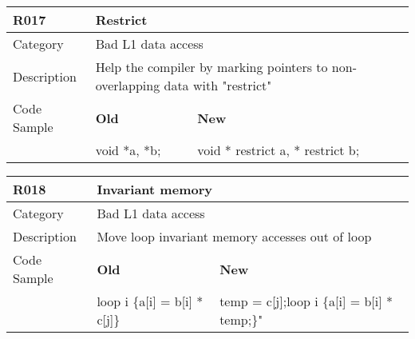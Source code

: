 \begin{tabular}{|p{0.9in}|p{2.0in}|p{2.0in}|} \hline
\textbf{R017}       & \multicolumn{2}{|p{4.0in}|}{\textbf{Restrict}} \\ \hline
Category            & \multicolumn{2}{|p{4.0in}|}{Bad L1 data access} \\ \hline
Description         & \multicolumn{2}{|p{4.0in}|}{Help the compiler by marking pointers to non-overlapping data with "restrict"} \\ \hline
Code Sample         & \textbf{Old} & \textbf{New} \\ \hline
                    & void *a, *b; & void * restrict a, * restrict b; \\ \hline
\end{tabular}

\begin{tabular}{|p{0.9in}|p{2.0in}|p{2.0in}|} \hline
\textbf{R018}       & \multicolumn{2}{|p{4.0in}|}{\textbf{Invariant memory}} \\ \hline
Category            & \multicolumn{2}{|p{4.0in}|}{Bad L1 data access} \\ \hline
Description         & \multicolumn{2}{|p{4.0in}|}{Move loop invariant memory accesses out of loop} \\ \hline
Code Sample         & \textbf{Old} & \textbf{New} \\ \hline
                    & loop i \{\newline   a[i] = b[i] * c[j]\newline\}
                    & temp = c[j];\newline loop i \{\newline   a[i] = b[i] * temp;\newline \}" \\ \hline
\end{tabular}

